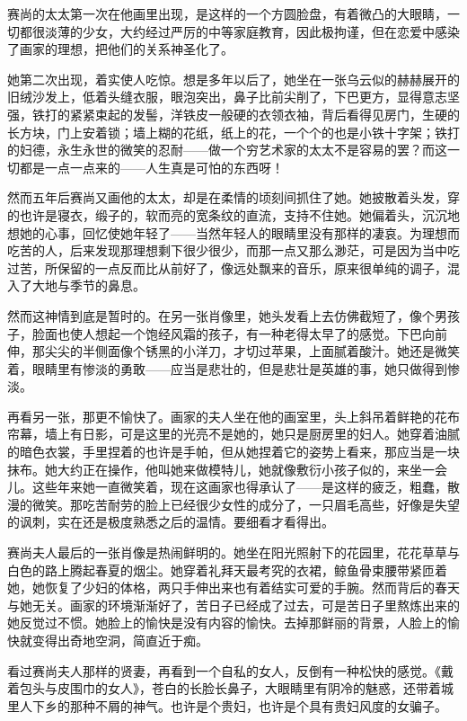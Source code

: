 \par 赛尚的太太第一次在他画里出现，是这样的一个方圆脸盘，有着微凸的大眼睛，一切都很淡薄的少女，大约经过严厉的中等家庭教育，因此极拘谨，但在恋爱中感染了画家的理想，把他们的关系神圣化了。
\par 她第二次出现，着实使人吃惊。想是多年以后了，她坐在一张乌云似的赫赫展开的旧绒沙发上，低着头缝衣服，眼泡突出，鼻子比前尖削了，下巴更方，显得意志坚强，铁打的紧紧束起的发髻，洋铁皮一般硬的衣领衣袖，背后看得见房门，生硬的长方块，门上安着锁；墙上糊的花纸，纸上的花，一个个的也是小铁十字架；铁打的妇德，永生永世的微笑的忍耐——做一个穷艺术家的太太不是容易的罢？而这一切都是一点一点来的——人生真是可怕的东西呀！
\par 然而五年后赛尚又画他的太太，却是在柔情的顷刻间抓住了她。她披散着头发，穿的也许是寝衣，缎子的，软而亮的宽条纹的直流，支持不住她。她偏着头，沉沉地想她的心事，回忆使她年轻了——当然年轻人的眼睛里没有那样的凄哀。为理想而吃苦的人，后来发现那理想剩下很少很少，而那一点又那么渺茫，可是因为当中吃过苦，所保留的一点反而比从前好了，像远处飘来的音乐，原来很单纯的调子，混入了大地与季节的鼻息。
\par 然而这神情到底是暂时的。在另一张肖像里，她头发看上去仿佛截短了，像个男孩子，脸面也使人想起一个饱经风霜的孩子，有一种老得太早了的感觉。下巴向前伸，那尖尖的半侧面像个锈黑的小洋刀，才切过苹果，上面腻着酸汁。她还是微笑着，眼睛里有惨淡的勇敢——应当是悲壮的，但是悲壮是英雄的事，她只做得到惨淡。
\par 再看另一张，那更不愉快了。画家的夫人坐在他的画室里，头上斜吊着鲜艳的花布帘幕，墙上有日影，可是这里的光亮不是她的，她只是厨房里的妇人。她穿着油腻的暗色衣裳，手里捏着的也许是手帕，但从她捏着它的姿势上看来，那应当是一块抹布。她大约正在操作，他叫她来做模特儿，她就像敷衍小孩子似的，来坐一会儿。这些年来她一直微笑着，现在这画家也得承认了——是这样的疲乏，粗蠢，散漫的微笑。那吃苦耐劳的脸上已经很少女性的成分了，一只眉毛高些，好像是失望的讽刺，实在还是极度熟悉之后的温情。要细看才看得出。
\par 赛尚夫人最后的一张肖像是热闹鲜明的。她坐在阳光照射下的花园里，花花草草与白色的路上腾起春夏的烟尘。她穿着礼拜天最考究的衣裙，鲸鱼骨束腰带紧匝着她，她恢复了少妇的体格，两只手伸出来也有着结实可爱的手腕。然而背后的春天与她无关。画家的环境渐渐好了，苦日子已经成了过去，可是苦日子里熬炼出来的她反觉过不惯。她脸上的愉快是没有内容的愉快。去掉那鲜丽的背景，人脸上的愉快就变得出奇地空洞，简直近于痴。
\par 看过赛尚夫人那样的贤妻，再看到一个自私的女人，反倒有一种松快的感觉。《戴着包头与皮围巾的女人》，苍白的长脸长鼻子，大眼睛里有阴冷的魅惑，还带着城里人下乡的那种不屑的神气。也许是个贵妇，也许是个具有贵妇风度的女骗子。
